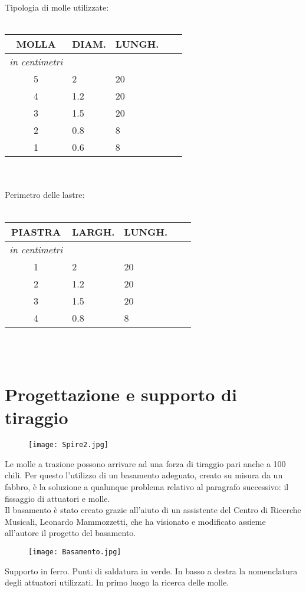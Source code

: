 Tipologia di molle utilizzate:
\\ \\
\begin{tabular}{cp{2cm}p{2cm}p{.2cm}p{2cm}} \textbf{MOLLA}&\textbf{DIAM.}&\textbf{LUNGH.}\\ 
\hline \textit{in centimetri} \\
\hline 5&2&20\\
\hline 4&1.2&20\\
\hline 3&1.5&20\\
\hline 2&0.8&8\\
\hline 1&0.6&8\\
\end{tabular}
\\ \\
Perimetro delle lastre:
\\ \\
\begin{tabular}{cp{2cm}p{2cm}p{.2cm}p{2cm}} \textbf{PIASTRA}&\textbf{LARGH.}&\textbf{LUNGH.}\\ 
\hline \textit{in centimetri} \\
\hline 1&2&20\\
\hline 2&1.2&20\\
\hline 3&1.5&20\\
\hline 4&0.8&8\\
\end{tabular}
\\ \\

\section{Progettazione e supporto di tiraggio}

 \begin{figure}[htbp]
        \centering
        \texttt{[image: Spire2.jpg]}
\end{figure}

Le molle a trazione possono arrivare ad una forza di tiraggio pari anche a 100 chili. Per questo l'utilizzo di un basamento adeguato, creato su misura da un fabbro, è la soluzione a qualunque problema relativo al paragrafo successivo: il fissaggio di attuatori e molle.\\


Il basamento è stato creato grazie all'aiuto di un assistente del Centro di Ricerche Musicali, Leonardo Mammozzetti, che ha visionato e modificato assieme all'autore il progetto del basamento.  \begin{figure}[htbp]
        \centering
        \texttt{[image: Basamento.jpg]}
\end{figure}
Supporto in ferro. Punti di saldatura in verde. In basso a destra la nomenclatura degli attuatori utilizzati.
In primo luogo la ricerca delle molle. 

